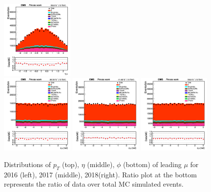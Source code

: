 \documentclass{cernatlasnote}
\newcommand{\pt}{$p_{\text T}$\xspace}
\begin{document}
\begin{figure}[htp]
 \includegraphics[width=0.32\textwidth]{images/emu_channel/2018/18_Range_0pt7_1pt3/leading_muon_eta_trig_Linear.png}\\
 \includegraphics[width=0.32\textwidth]{images/emu_channel/2016/16_Range_0pt7_1pt3/leading_muon_phi_trig_Linear.png}
\includegraphics[width=0.32\textwidth]{images/emu_channel/2017/17_Range_0pt7_1pt3/leading_muon_phi_trig_Linear.png}
 \includegraphics[width=0.32\textwidth]{images/emu_channel/2018/18_Range_0pt7_1pt3/leading_muon_phi_trig_Linear.png}
 \caption{Distributions of $p_{T}$ (top), $\eta$ (middle), $\phi$ (bottom) of leading $\mu$ for 2016 (left), 2017 (middle), 2018(right). Ratio plot at the bottom represents the ratio of data over total MC simulated events.}
 \label{fig:mu_dist}
  \end{figure}
\end{document}
